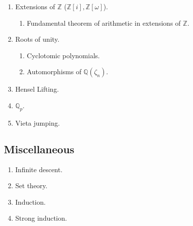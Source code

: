 \documentclass{article}
\begin{document}
\begin{enumerate}
\item[\underline{\hspace{0.4cm}}] Extensions of $\mathbb{Z}$ ($\mathbb{Z}[i], \mathbb{Z}[\omega]$).
\begin{enumerate}
\item[\underline{\hspace{0.4cm}}] Fundamental theorem of arithmetic in extensions of $\mathbb{Z}$.
\end{enumerate}
\item[\underline{\hspace{0.4cm}}] Roots of unity.
\begin{enumerate}
\item[\underline{\hspace{0.4cm}}] Cyclotomic polynomials.
\item[\underline{\hspace{0.4cm}}] Automorphisms of $\mathbb{Q}(\zeta_n)$.
\end{enumerate}
\item[\underline{\hspace{0.4cm}}] Hensel Lifting.
\item[\underline{\hspace{0.4cm}}] $\mathbb{Q}_p$.
\item[\underline{\hspace{0.4cm}}] Vieta jumping.
\end{enumerate}

\subsection*{Miscellaneous}
\begin{enumerate}
\item[\underline{\hspace{0.4cm}}] Infinite descent.
\item[\underline{\hspace{0.4cm}}] Set theory.
\item[\underline{\hspace{0.4cm}}] Induction.
\item[\underline{\hspace{0.4cm}}] Strong induction.
\end{enumerate}
\end{document}
